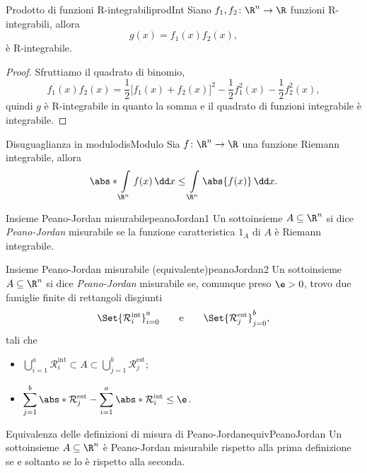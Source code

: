 \begin{prop}{Prodotto di funzioni R-integrabili}{prodInt}
	Siano \(f_1,f_2\colon\R^n\to\R\) funzioni R-integrabili, allora
	\[
		g(x)=f_1(x)f_2(x),
	\]
	è R-integrabile.
\end{prop}

\begin{proof}
	Sfruttiamo il quadrato di binomio,
	\[
		f_1(x)f_2(x)=\frac{1}{2}\big[f_1(x)+f_2(x)\big]^2- \frac{1}{2}f_1^2(x)- \frac{1}{2}f_2^2(x),
	\]
	quindi \(g\) è R-integrabile in quanto la somma e il quadrato di funzioni integrabile è integrabile.
\end{proof}

\begin{prop}{Disuguaglianza in modulo}{disModulo}
	Sia \(f\colon\R^n\to\R\) una funzione Riemann integrabile, allora
	\[
		\abs*{\int\limits_{\R^n}f(x)\,\dd x}\le \int\limits_{\R^n}\abs{f(x)}\,\dd x.
	\]
\end{prop}

\begin{defn}{Insieme Peano-Jordan misurabile}{peanoJordan1}
	Un sottoinsieme \(A\subseteq\R^n\) si dice \emph{Peano-Jordan} misurabile se la funzione caratteristica \(1_A\) di \(A\) è Riemann integrabile.
\end{defn}

\begin{defn}{Insieme Peano-Jordan misurabile (equivalente)}{peanoJordan2}
	Un sottoinsieme \(A\subseteq\R^n\) si dice \emph{Peano-Jordan} misurabile se, comunque preso \(\e>0\), trovo due famiglie finite di rettangoli disgiunti
	\[
		\Set{\mathcal{R}_i^{\text{int}}}_{i=0}^a \qquad\text{e}\qquad\Set{\mathcal{R}_j^\text{est}}_{j=0}^b,
	\]
	tali che
	\begin{itemize}
		\item \(\displaystyle\bigcup_{i=1}^a\mathcal{R}_i^\text{int}\subset A\subset \bigcup_{j=1}^b \mathcal{R}_j^\text{est}\);
		\item \(\displaystyle\sum_{j=1}^b\abs*{\mathcal{R}_j^\text{est}}-\sum_{i=1}^a\abs*{\mathcal{R}_i^\text{int}}\le \e\).
	\end{itemize}
\end{defn}

\begin{teor}{Equivalenza delle definizioni di misura di Peano-Jordan}{equivPeanoJordan}
	Un sottoinsieme \(A\subseteq\R^n\) è Peano-Jordan misurabile rispetto alla prima definizione se e soltanto se lo è rispetto alla seconda.
\end{teor}

